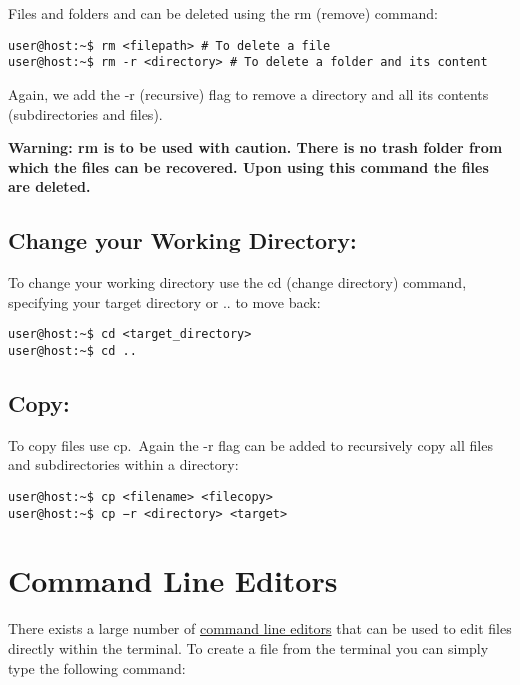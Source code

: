 \documentclass[
]{book}
\begin{document}
Files and folders and can be deleted using the rm (remove) command:

\begin{verbatim}
user@host:~$ rm <filepath> # To delete a file
user@host:~$ rm -r <directory> # To delete a folder and its content
\end{verbatim}

Again, we add the -r (recursive) flag to remove a directory and all its contents (subdirectories and files).

\textbf{Warning: rm is to be used with caution. There is no trash folder
from which the files can be recovered. Upon using this command the files are deleted.}

\hypertarget{change-your-working-directory}{%
\subsection{Change your Working Directory:}\label{change-your-working-directory}}

To change your working directory use the cd (change directory) command, specifying your target directory or .. to move back:

\begin{verbatim}
user@host:~$ cd <target_directory>
user@host:~$ cd ..
\end{verbatim}

\hypertarget{copy}{%
\subsection{Copy:}\label{copy}}

To copy files use cp.~Again the -r flag can be added to recursively copy all files and subdirectories within a directory:

\begin{verbatim}
user@host:~$ cp <filename> <filecopy>
user@host:~$ cp −r <directory> <target>
\end{verbatim}

\hypertarget{command-line-editors}{%
\section{Command Line Editors}\label{command-line-editors}}

There exists a large number of \href{https://en.wikipedia.org/wiki/List_of_text_editors}{command line editors}
that can be used to edit files directly within the terminal.
To create a file from the terminal you can simply type the following command:
\end{document}
